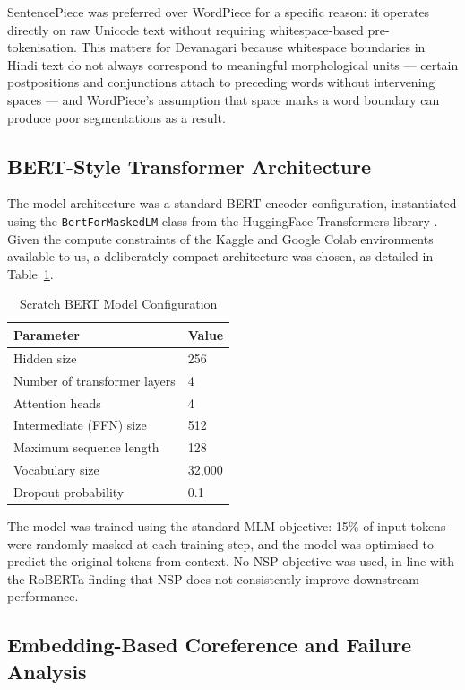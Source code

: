 \documentclass[12pt,a4paper]{report}
\begin{document}
\noindent SentencePiece was preferred over WordPiece for a specific reason: it operates directly on raw Unicode text without requiring whitespace-based pre-tokenisation. This matters for Devanagari because whitespace boundaries in Hindi text do not always correspond to meaningful morphological units --- certain postpositions and conjunctions attach to preceding words without intervening spaces --- and WordPiece's assumption that space marks a word boundary can produce poor segmentations as a result.

\subsection{BERT-Style Transformer Architecture}

The model architecture was a standard BERT encoder configuration, instantiated using the \texttt{BertForMaskedLM} class from the HuggingFace Transformers library \cite{wolf2020transformers}. Given the compute constraints of the Kaggle and Google Colab environments available to us, a deliberately compact architecture was chosen, as detailed in Table~\ref{tab:bert_config}.

\begin{table}[H]
\centering
\caption{Scratch BERT Model Configuration}
\label{tab:bert_config}
\begin{tabular}{|l|l|}
\hline
\textbf{Parameter} & \textbf{Value} \\
\hline
Hidden size & 256 \\
Number of transformer layers & 4 \\
Attention heads & 4 \\
Intermediate (FFN) size & 512 \\
Maximum sequence length & 128 \\
Vocabulary size & 32,000 \\
Dropout probability & 0.1 \\
\hline
\end{tabular}
\end{table}

\noindent The model was trained using the standard MLM objective: 15\% of input tokens were randomly masked at each training step, and the model was optimised to predict the original tokens from context. No NSP objective was used, in line with the RoBERTa finding that NSP does not consistently improve downstream performance.

\subsection{Embedding-Based Coreference and Failure Analysis}
\end{document}
